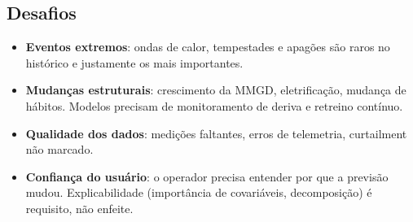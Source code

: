 \documentclass[10pt,a4paper,oneside]{article}
\begin{document}
\subsection{Desafios}
\begin{itemize}
  \item \textbf{Eventos extremos}: ondas de calor, tempestades e apagões são
    raros no histórico e justamente os mais importantes.
  \item \textbf{Mudanças estruturais}: crescimento da MMGD, eletrificação,
    mudança de hábitos. Modelos precisam de monitoramento de deriva e
    retreino contínuo.
  \item \textbf{Qualidade dos dados}: medições faltantes, erros de telemetria,
    curtailment não marcado.
  \item \textbf{Confiança do usuário}: o operador precisa entender por que a
    previsão mudou. Explicabilidade (importância de covariáveis, decomposição)
    é requisito, não enfeite.
\end{itemize}
\end{document}
